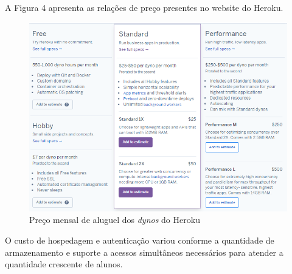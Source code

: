 \documentclass[
    12pt,               %
    openright,          %
    oneside,
    a4paper,            %
    paginasA3,  %
    english,            %
    brazil              %
    ]{ifsp-spo-inf-ctds} %
\begin{document}
A Figura 4 apresenta as relações de preço presentes no website do Heroku.

\begin{figure}[htb]
    \centering
	\includegraphics[width=16cm]{imagens/precos-heroku.png}
	\caption{Preço mensal de aluguel dos \textit{\glspl{dyno}} do Heroku}
\end{figure}


O custo de hospedagem e autenticação variou conforme a quantidade de armazenamento e suporte a acessos simultâneos necessários para atender a quantidade crescente de alunos.




%
%
%
%



%



\end{document}
